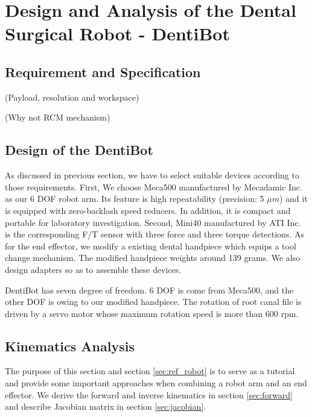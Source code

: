 \chapter{Design and Analysis of the Dental Surgical Robot - DentiBot}
\section{Requirement and Specification}
(Payload, resolution and workspace)														\par\noindent
(Why not RCM mechanism)		
															
\section{Design of the DentiBot}
As discussed in previous section, we have to select suitable devices according to those requirements. First, We choose Meca500 manufactured by Mecadamic Inc. as our 6 DOF robot arm. Its feature is high repeatability (precision: 5 $\mu m$) and it is equipped with zero-backlash speed reducers. In addition, it is compact and portable for laboratory investigation. Second, Mini40 manufactured by ATI Inc. is the corresponding F/T sensor with three force and three torque detections. As for the end effector, we modify a existing dental handpiece which equips a tool change mechanism. The modified handpiece weights around 139 grams. We also design  adapters so as to assemble these devices.
\par\noindent
DentiBot has seven degree of freedom. 6 DOF is come from Meca500, and the other DOF is owing to our modified handpiece. The rotation of root canal file is driven by a servo motor whose maximum rotation speed is more than 600 rpm.																		
\section{Kinematics Analysis}
\label{sec:kinematics}
The purpose of this section and section \ref{sec:ref_robot} is to serve as a tutorial and provide some important approaches when combining a robot arm and an end effector. We derive the forward and inverse kinematics in section \ref{sec:forward} and describe Jacobian matrix in section \ref{sec:jacobian}. 

